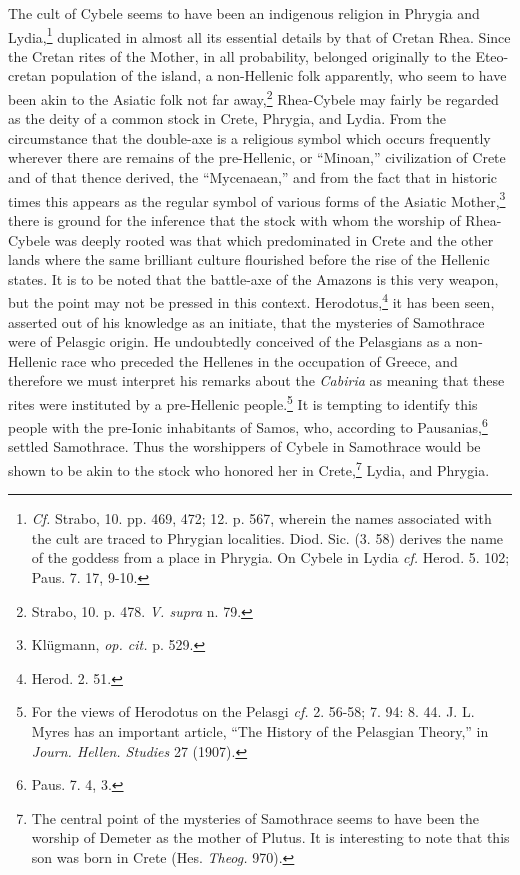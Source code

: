 \documentclass[a4paper, 12pt, oneside]{article}
\begin{document}
The cult of Cybele seems to have been an indigenous religion in Phrygia and Lydia,\footnote{\emph{Cf.} Strabo, 10. pp. 469, 472; 12. p. 567, wherein the names associated with the cult are traced to Phrygian localities. Diod. Sic. (3. 58) derives the name of the goddess from a place in Phrygia. On Cybele in Lydia \emph{cf.} Herod. 5. 102; Paus. 7. 17, 9-10.} duplicated in almost all its essential details by that of Cretan Rhea. Since the Cretan rites of the Mother, in all probability, belonged originally to the Eteo-cretan population of the island, a non-Hellenic folk apparently, who seem to have been akin to the Asiatic folk not far away,\footnote{Strabo, 10. p. 478. \emph{V. supra} n. 79.} Rhea-Cybele may fairly be regarded as the deity of a common stock in Crete, Phrygia, and Lydia. From the circumstance that the double-axe is a religious symbol which occurs frequently wherever there are remains of the pre-Hellenic, or ``Minoan,'' civilization of Crete and of that thence derived, the ``Mycenaean,'' and from the fact that in historic times this appears as the regular symbol of various forms of the Asiatic Mother,\footnote{Klügmann, \emph{op. cit.} p. 529.} there is ground for the inference that the stock with whom the worship of Rhea-Cybele was deeply rooted was that which predominated in Crete and the other lands where the same brilliant culture flourished before the rise of the Hellenic states. It is to be noted that the battle-axe of the Amazons is this very weapon, but the point may not be pressed in this context. Herodotus,\footnote{Herod. 2. 51.} it has been seen, asserted out of his knowledge as an initiate, that the mysteries of Samothrace were of Pelasgic origin. He undoubtedly conceived of the Pelasgians as a non-Hellenic race who preceded the Hellenes in the occupation of Greece, and therefore we must interpret his remarks about the \emph{Cabiria} as meaning that these rites were instituted by a pre-Hellenic people.\footnote{For the views of Herodotus on the Pelasgi \emph{cf.} 2. 56-58; 7. 94: 8. 44. J. L. Myres has an important article, ``The History of the Pelasgian Theory,'' in \emph{Journ. Hellen. Studies} 27 (1907).} It is tempting to identify this people with the pre-Ionic inhabitants of Samos, who, according to Pausanias,\footnote{Paus. 7. 4, 3.} settled Samothrace. Thus the worshippers of Cybele in Samothrace would be shown to be akin to the stock who honored her in Crete,\footnote{The central point of the mysteries of Samothrace seems to have been the worship of Demeter as the mother of Plutus. It is interesting to note that this son was born in Crete (Hes. \emph{Theog.} 970).} Lydia, and Phrygia.
\end{document}
